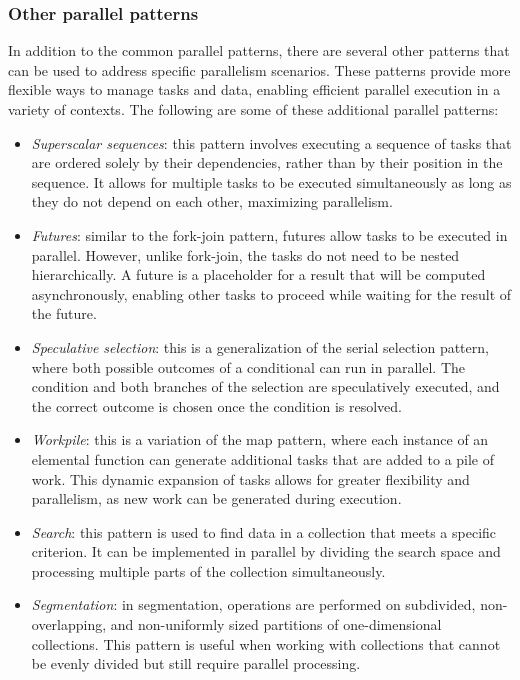 \subsubsection{Other parallel patterns}
In addition to the common parallel patterns, there are several other patterns that can be used to address specific parallelism scenarios. 
These patterns provide more flexible ways to manage tasks and data, enabling efficient parallel execution in a variety of contexts.
The following are some of these additional parallel patterns:
\begin{itemize}
    \item \textit{Superscalar sequences}: this pattern involves executing a sequence of tasks that are ordered solely by their dependencies, rather than by their position in the sequence. 
        It allows for multiple tasks to be executed simultaneously as long as they do not depend on each other, maximizing parallelism.
    \item \textit{Futures}: similar to the fork-join pattern, futures allow tasks to be executed in parallel. 
        However, unlike fork-join, the tasks do not need to be nested hierarchically. 
        A future is a placeholder for a result that will be computed asynchronously, enabling other tasks to proceed while waiting for the result of the future.
    \item \textit{Speculative selection}: this is a generalization of the serial selection pattern, where both possible outcomes of a conditional can run in parallel. 
        The condition and both branches of the selection are speculatively executed, and the correct outcome is chosen once the condition is resolved.
    \item \textit{Workpile}: this is a variation of the map pattern, where each instance of an elemental function can generate additional tasks that are added to a pile of work. 
        This dynamic expansion of tasks allows for greater flexibility and parallelism, as new work can be generated during execution.
    \item \textit{Search}: this pattern is used to find data in a collection that meets a specific criterion. 
        It can be implemented in parallel by dividing the search space and processing multiple parts of the collection simultaneously.
    \item \textit{Segmentation}: in segmentation, operations are performed on subdivided, non-overlapping, and non-uniformly sized partitions of one-dimensional collections. 
        This pattern is useful when working with collections that cannot be evenly divided but still require parallel processing.

\end{itemize}
